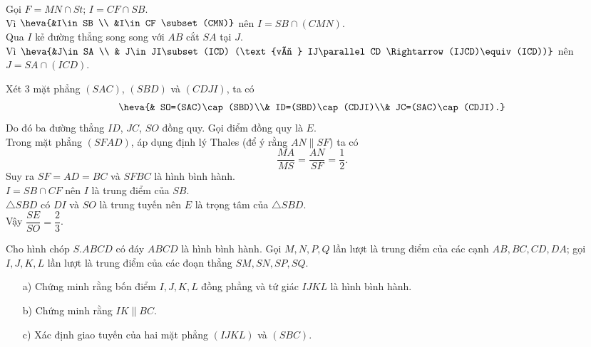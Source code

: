 \begin{bt}
{\begin{listEX}
			Gọi $ F=MN\cap St $; $ I=CF\cap SB $.\\
			Vì $ \heva{&I\in SB \\ &I\in CF \subset (CMN)} $ nên $ I=SB\cap (CMN) $.\\
			Qua $ I $ kẻ đường thẳng song song với $ AB $  cắt $ SA $ tại $ J $.\\
			Vì $ \heva{&J\in SA \\ & J\in JI\subset (ICD) (\text{vì } IJ\parallel CD \Rightarrow (IJCD)\equiv (ICD))} $ nên $ J=SA\cap (ICD) $.
			\item Xét $ 3 $ mặt phẳng $ (SAC) $, $ (SBD) $ và $ (CDJI) $, ta có
			$$\heva{& SO=(SAC)\cap (SBD)\\& ID=(SBD)\cap (CDJI)\\& JC=(SAC)\cap (CDJI).}$$
			Do đó ba đường thẳng $ ID $, $ JC $, $ SO $ đồng quy. Gọi điểm đồng quy là $ E $.\\
			Trong mặt phẳng $ (SFAD) $, áp dụng định lý Thales (để ý rằng $ AN\parallel SF $) ta có
			\[ \dfrac{MA}{MS}=\dfrac{AN}{SF}=\dfrac{1}{2}. \]
			Suy ra $ SF=AD=BC $ và $ SFBC $ là hình bình hành.\\
			$ I=SB\cap CF $ nên $ I $ là trung điểm của $ SB $.\\
			$ \triangle SBD $ có $ DI $ và $ SO $ là trung tuyến nên $ E $ là trọng tâm của $ \triangle SBD $.\\
			Vậy $ \dfrac{SE}{SO}=\dfrac{2}{3} $.
		\end{listEX}
	}
\end{bt}
\begin{bt}
	Cho hình chóp $S.ABCD$ có đáy $ABCD$ là hình bình hành. Gọi $M, N, P, Q$ lần lượt là trung điểm của các cạnh $AB, BC, CD, DA$; gọi $I, J, K, L$ lần lượt là trung điểm của các đoạn thẳng $SM, SN, SP, SQ$.
	\begin{itemize}
		\item [a)] Chứng minh rằng bốn điểm $I, J, K, L$ đồng phẳng và tứ giác $IJKL$ là hình bình hành.
		\item [b)] Chứng minh rằng $IK\parallel BC$.
		\item [c)] Xác định giao tuyến của hai mặt phẳng $\left(IJKL\right)$ và $\left(SBC\right)$.
	\end{itemize} 
\end{bt}


